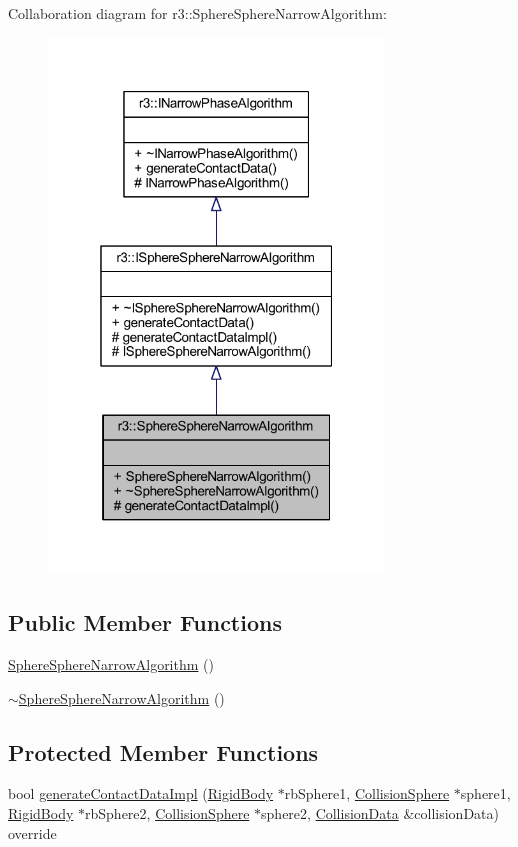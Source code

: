 Collaboration diagram for r3\+:\+:Sphere\+Sphere\+Narrow\+Algorithm\+:\nopagebreak
\begin{figure}[H]
\begin{center}
\leavevmode
\includegraphics[width=253pt]{classr3_1_1_sphere_sphere_narrow_algorithm__coll__graph}
\end{center}
\end{figure}
\subsection*{Public Member Functions}
\begin{DoxyCompactItemize}
\item 
\mbox{\hyperlink{classr3_1_1_sphere_sphere_narrow_algorithm_a502f461be63a812401d8d31cf094a143}{Sphere\+Sphere\+Narrow\+Algorithm}} ()
\item 
\mbox{\hyperlink{classr3_1_1_sphere_sphere_narrow_algorithm_a365b1ed48fff669c4a5b700f3dd7d30c}{$\sim$\+Sphere\+Sphere\+Narrow\+Algorithm}} ()
\end{DoxyCompactItemize}
\subsection*{Protected Member Functions}
\begin{DoxyCompactItemize}
\item 
bool \mbox{\hyperlink{classr3_1_1_sphere_sphere_narrow_algorithm_a3559238de013b2fb8f3786e365e2ace7}{generate\+Contact\+Data\+Impl}} (\mbox{\hyperlink{classr3_1_1_rigid_body}{Rigid\+Body}} $\ast$rb\+Sphere1, \mbox{\hyperlink{classr3_1_1_collision_sphere}{Collision\+Sphere}} $\ast$sphere1, \mbox{\hyperlink{classr3_1_1_rigid_body}{Rigid\+Body}} $\ast$rb\+Sphere2, \mbox{\hyperlink{classr3_1_1_collision_sphere}{Collision\+Sphere}} $\ast$sphere2, \mbox{\hyperlink{classr3_1_1_collision_data}{Collision\+Data}} \&collision\+Data) override
\end{DoxyCompactItemize}


